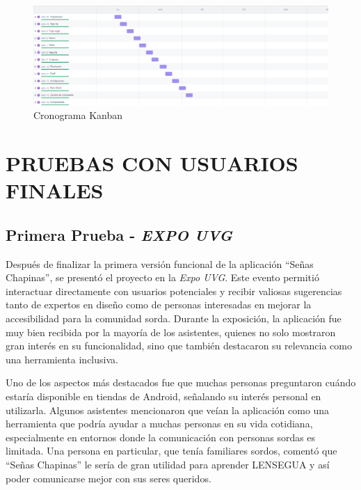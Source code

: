 \begin{figure} [H]
    \centering
    \includegraphics[width=1\linewidth]{figuras/kanban.png}
    \caption{Cronograma Kanban}
    \label{fig:enter-label}
\end{figure}




\section{PRUEBAS CON USUARIOS FINALES}


\subsection{Primera Prueba - \textit{EXPO UVG}}

Después de finalizar la primera versión funcional de la aplicación ``Señas Chapinas'', se presentó el proyecto en la \textit{Expo UVG}. Este evento permitió interactuar directamente con usuarios potenciales y recibir valiosas sugerencias tanto de expertos en diseño como de personas interesadas en mejorar la accesibilidad para la comunidad sorda. Durante la exposición, la aplicación fue muy bien recibida por la mayoría de los asistentes, quienes no solo mostraron gran interés en su funcionalidad, sino que también destacaron su relevancia como una herramienta inclusiva.

Uno de los aspectos más destacados fue que muchas personas preguntaron cuándo estaría disponible en tiendas de Android, señalando su interés personal en utilizarla. Algunos asistentes mencionaron que veían la aplicación como una herramienta que podría ayudar a muchas personas en su vida cotidiana, especialmente en entornos donde la comunicación con personas sordas es limitada. Una persona en particular, que tenía familiares sordos, comentó que ``Señas Chapinas'' le sería de gran utilidad para aprender LENSEGUA y así poder comunicarse mejor con sus seres queridos.


